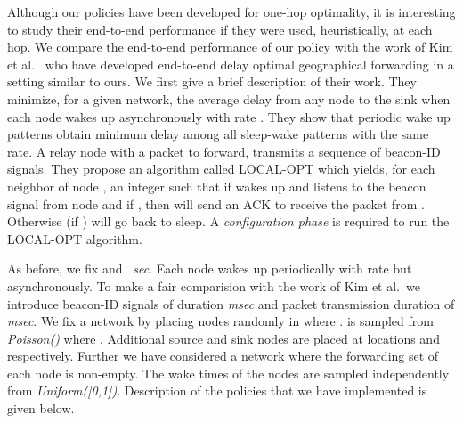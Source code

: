 \documentclass[onecolumn]{IEEEtran}
\begin{document}
Although our policies have been developed for one-hop optimality, it
is interesting to study their end-to-end performance if they were
used, heuristically, at each hop.  We compare the end-to-end
performance of our policy with the work of Kim et
al.~\cite{kim-etal09optimal-anycast} who have developed end-to-end
delay optimal geographical forwarding in a setting similar to ours. We
first give a brief description of their work. They minimize, for a
given network, the average delay from any node to the sink when each
node  wakes up asynchronously with rate . They show that
periodic wake up patterns obtain minimum delay among all sleep-wake
patterns with the same rate. A relay node with a packet to forward,
transmits a sequence of beacon-ID signals. They propose an algorithm
called LOCAL-OPT \cite{kim-etal08tech-report} which yields, for each
neighbor  of node , an integer  such that if 
wakes up and listens to the  beacon signal from node  and if
, then  will send an ACK to receive the packet
from . Otherwise (if )  will go back to sleep. A
\emph{configuration phase} is required to run the LOCAL-OPT algorithm.

As before, we fix  and ~\emph{sec}. Each node wakes up
periodically with rate  but asynchronously.  To make a
fair comparision with the work of Kim et al.\ we introduce beacon-ID
signals of duration  \emph{msec} and packet transmission duration of
 \emph{msec}. We fix a network by placing  nodes randomly in  where .  is sampled from
\emph{Poisson()} where .  Additional source
and sink nodes are placed at locations  and 
respectively. Further we have considered a network where the
forwarding set of each node is non-empty.  The wake times of the
nodes are sampled independently from \emph{Uniform([0,1])}. Description of the policies that we have implemented is given below.
\end{document}
